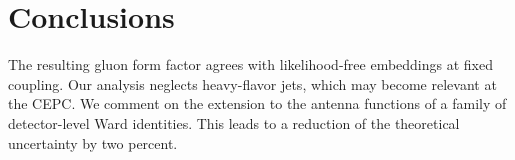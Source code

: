 \section{Conclusions}\label{sec:conclusions}

The resulting gluon form factor agrees with likelihood-free embeddings
at fixed coupling. Our analysis neglects heavy-flavor jets, which may
become relevant at the CEPC. We comment on the extension to the antenna
functions of a family of detector-level Ward identities. This leads to a
reduction of the theoretical uncertainty by two percent.

